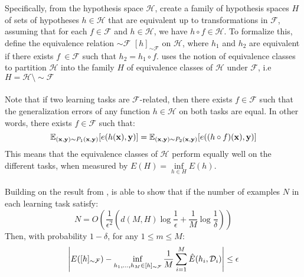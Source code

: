 Specifically, from the hypothesis space $\mathcal{H}$, create a family of hypothesis spaces $H$ of sets of hypotheses $h \in \mathcal{H}$ that are equivalent up to transformations in $\mathcal{F}$, assuming that for each $f \in \mathcal{F}$ and $h \in \mathcal{H}$, we have $h \circ f \in \mathcal{H}$. To formalize this, \citet{ben2003} define the equivalence relation $\sim \mathcal{F}$ $[h]_{\sim \mathcal{F}}$ on $\mathcal{H}$, where $h_1$ and $h_2$ are equivalent if there exists $f\ \in \mathcal{F}$ such that $h_2 = h_1 \circ f$. \citet{ben2003} uses the notion of equivalence classes to partition $\mathcal{H}$ into the family $H$ of equivalence classes of $\mathcal{H}$ under $\mathcal{F}$, i.e $H = \mathcal{H} \setminus \sim \mathcal{F}$
\\\\
Note that if two learning tasks are $\mathcal{F}$-related, then there exists $f \in \mathcal{F}$ such that the generalization errors of any function $h \in \mathcal{H}$ on both tasks are equal. In other words, there exists $f \in \mathcal{F}$ such that:
$$
\mathbb{E}_{(\mathbf{x}, \mathbf{y}) \sim P_1(\mathbf{x}, \mathbf{y})}[e(h(\mathbf{x}), \mathbf{y})] = \mathbb{E}_{(\mathbf{x}, \mathbf{y}) \sim P_2(\mathbf{x}, \mathbf{y})}[e((h \circ f)(\mathbf{x}), \mathbf{y})]
$$
This means that the equivalence classes of $\mathcal{H}$ perform equally well on the different tasks, when measured by $E(H) = \inf\limits_{h \in H}E(h)$.
\\\\
Building on the result from \citet{baxter2000}, \citet{ben2003} is able to show that if the number of examples $N$ in each learning task satisfy:
$$
N = O\left(\frac{1}{\epsilon^2}\left(d(M, H) \log \frac{1}{\epsilon} + \frac{1}{M} \log \frac{1}{\delta}\right)\right)
$$
Then, with probability $1 - \delta$, for any $1 \leq m \leq M$:
$$
\left| E([h]_{\sim \mathcal{F}}) - \inf\limits_{h_1,\dots,h_M \in [h]_{\sim \mathcal{F}}} \frac{1}{M}\sum\limits_{i = 1}^M \hat{E}(h_i, \mathcal{D}_i)\right|  \leq \epsilon
$$